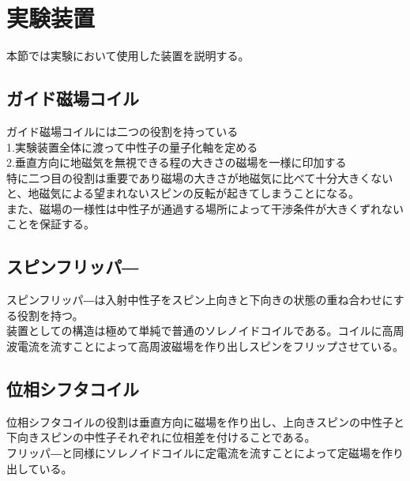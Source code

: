 
\section{実験装置}
本節では実験において使用した装置を説明する。
\subsection{ガイド磁場コイル}
ガイド磁場コイルには二つの役割を持っている\\
1.実験装置全体に渡って中性子の量子化軸を定める\\
2.垂直方向に地磁気を無視できる程の大きさの磁場を一様に印加する\\
特に二つ目の役割は重要であり磁場の大きさが地磁気に比べて十分大きくないと、地磁気による望まれないスピンの反転が起きてしまうことになる。
\\また、磁場の一様性は中性子が通過する場所によって干渉条件が大きくずれないことを保証する。
\subsection{スピンフリッパ―}
スピンフリッパ―は入射中性子をスピン上向きと下向きの状態の重ね合わせにする役割を持つ。\\
装置としての構造は極めて単純で普通のソレノイドコイルである。コイルに高周波電流を流すことによって高周波磁場を作り出しスピンをフリップさせている。
\subsection{位相シフタコイル}
位相シフタコイルの役割は垂直方向に磁場を作り出し、上向きスピンの中性子と下向きスピンの中性子それぞれに位相差を付けることである。\\
フリッパ―と同様にソレノイドコイルに定電流を流すことによって定磁場を作り出している。
